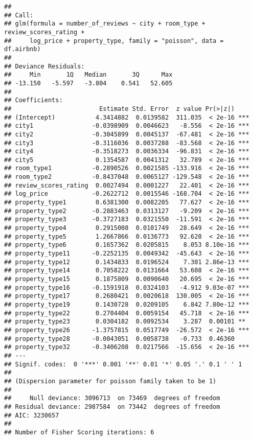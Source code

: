 \documentclass[
]{article}
\begin{document}
\begin{verbatim}
## 
## Call:
## glm(formula = number_of_reviews ~ city + room_type + review_scores_rating + 
##     log_price + property_type, family = "poisson", data = df.airbnb)
## 
## Deviance Residuals: 
##     Min       1Q   Median       3Q      Max  
## -13.150   -5.597   -3.804    0.541   52.605  
## 
## Coefficients:
##                        Estimate Std. Error  z value Pr(>|z|)    
## (Intercept)           4.3414882  0.0139582  311.035  < 2e-16 ***
## city1                -0.0398909  0.0046623   -8.556  < 2e-16 ***
## city2                -0.3045899  0.0045137  -67.481  < 2e-16 ***
## city3                -0.3116036  0.0037288  -83.568  < 2e-16 ***
## city4                -0.3518273  0.0036334  -96.831  < 2e-16 ***
## city5                 0.1354587  0.0041312   32.789  < 2e-16 ***
## room_type1           -0.2890526  0.0021585 -133.916  < 2e-16 ***
## room_type2           -0.8437048  0.0065127 -129.548  < 2e-16 ***
## review_scores_rating  0.0027494  0.0001227   22.401  < 2e-16 ***
## log_price            -0.2622712  0.0015546 -168.704  < 2e-16 ***
## property_type1        0.6381300  0.0082205   77.627  < 2e-16 ***
## property_type2       -0.2883463  0.0313127   -9.209  < 2e-16 ***
## property_type3       -0.3727183  0.0321550  -11.591  < 2e-16 ***
## property_type4        0.2915008  0.0101749   28.649  < 2e-16 ***
## property_type5        1.2667866  0.0136773   92.620  < 2e-16 ***
## property_type6        0.1657362  0.0205815    8.053 8.10e-16 ***
## property_type11      -0.2252135  0.0049342  -45.643  < 2e-16 ***
## property_type12       0.1434833  0.0196524    7.301 2.86e-13 ***
## property_type14       0.7058222  0.0131664   53.608  < 2e-16 ***
## property_type15       0.1875809  0.0090640   20.695  < 2e-16 ***
## property_type16      -0.1591918  0.0324103   -4.912 9.03e-07 ***
## property_type17       0.2680421  0.0020618  130.005  < 2e-16 ***
## property_type19       0.1430728  0.0209105    6.842 7.80e-12 ***
## property_type22       0.2704404  0.0059154   45.718  < 2e-16 ***
## property_type23       0.0304182  0.0092534    3.287  0.00101 ** 
## property_type26      -1.3757815  0.0517749  -26.572  < 2e-16 ***
## property_type28      -0.0043051  0.0058738   -0.733  0.46360    
## property_type32      -0.3406208  0.0217566  -15.656  < 2e-16 ***
## ---
## Signif. codes:  0 '***' 0.001 '**' 0.01 '*' 0.05 '.' 0.1 ' ' 1
## 
## (Dispersion parameter for poisson family taken to be 1)
## 
##     Null deviance: 3096713  on 73469  degrees of freedom
## Residual deviance: 2987584  on 73442  degrees of freedom
## AIC: 3230657
## 
## Number of Fisher Scoring iterations: 6
\end{verbatim}
\end{document}
